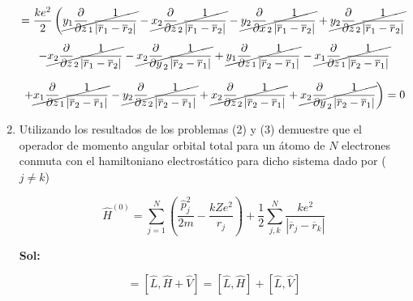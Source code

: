 \documentclass[12pt,a4paper]{article}
\begin{document}
\begin{enumerate}
\begin{equation*}
    =\frac{ke^2}{2}\left(\cancel{y_{1} \frac{\partial}{\partial z}_1 \frac{1}{|\overline{r}_{1} - \overline{r}_2|}} -\cancel{x_{2} \frac{\partial}{\partial z}_2\frac{1}{|\overline{r}_{1} - \overline{r}_2|}} -\cancel{y_{2} \frac{\partial}{\partial x}_2\frac{1}{|\overline{r}_{1} - \overline{r}_2|}} + \cancel{y_{2} \frac{\partial}{\partial z}_2\frac{1}{|\overline{r}_{1} - \overline{r}_2|}} \right.
\end{equation*}

\begin{equation*}
     -\cancel{x_{2} \frac{\partial}{\partial z}_2\frac{1}{|\overline{r}_{1} - \overline{r}_2|}} -\cancel{x_{2} \frac{\partial}{\partial y}_2\frac{1}{|\overline{r}_{2} - \overline{r}_1|}} +\cancel{y_{1} \frac{\partial}{\partial z}_1\frac{1}{|\overline{r}_{2} - \overline{r}_1|}} -\cancel{x_{1} \frac{\partial}{\partial z}_1\frac{1}{|\overline{r}_{2} - \overline{r}_1|}} 
\end{equation*}

\begin{equation*}
    \left.+\cancel{x_{1} \frac{\partial}{\partial z}_1\frac{1}{|\overline{r}_{2} - \overline{r}_1|} }-\cancel {y_{2} \frac{\partial}{\partial z}_2\frac{1}{|\overline{r}_{2} - \overline{r}_1|}}+\cancel{x_{2} \frac{\partial}{\partial z}_2\frac{1}{|\overline{r}_{2} - \overline{r}_1|}} +\cancel{ x_{2} \frac{\partial}{\partial y}_2 \frac{1}{|\overline{r}_{2} - \overline{r}_1|}} \right) = 0
\end{equation*}













\item Utilizando los resultados de los problemas (2) y (3)  demuestre que el operador de momento angular orbital total para un átomo de $N$ electrones conmuta con el hamiltoniano electrostático para dicho sistema dado por ($j\neq k$)

\begin{equation*}
    \hat{H}^{(0)} = \sum_{j=1}^{N} \left(\frac{\hat{p}_{j}^{2}}{2m} - \frac{kZe^2}{r_j}\right) + \frac{1}{2} \sum_{j,k}^{N} \frac{ke^2}{|\overline{r}_j - \overline{r}_k|}
\end{equation*}

\textbf{Sol:}

\begin{equation*}
    [\hat{L}, \hat{H}^{(0)}] = [\hat{L},\hat{H} + \hat{V}] = [\hat{L},\hat{H}] + [\hat{L}, \hat{V}] 
\end{equation*}


\end{enumerate}
\end{document}
